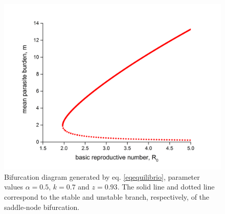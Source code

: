 \documentclass[12pt,a4paper]{article}
\theoremstyle{plain}%
\theoremstyle{definition}
\theoremstyle{remark}
\begin{document}
	\begin{figure}[h!]
		\centering
		\includegraphics[width=0.99\linewidth]{bifurcation}
		\caption{Bifurcation diagram generated by eq. \eqref{eqequilibrio}, parameter values $\alpha=0.5$, $k=0.7$ and $z=0.93$.
		The solid line and dotted line correspond to the stable and unstable branch, respectively, of the saddle-node bifurcation.}
		\label{f:phase}
	\end{figure}
	
\end{document}
